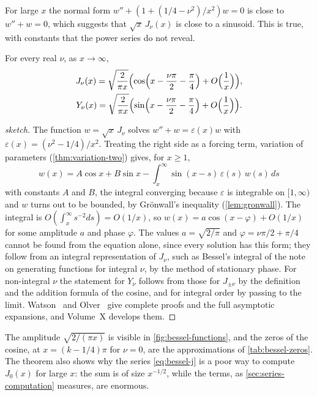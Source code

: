 For large $x$ the normal form $w''+(1+(1/4-\nu^2)/x^2)w=0$ is close to $w''+w=0$, which suggests that $\sqrt x\,J_\nu(x)$ is close to a sinusoid. This is true, with constants that the power series do not reveal.

\begin{theorem}
\label{thm:bessel-asymptotic}
For every real $\nu$, as $x\to\infty$,
\begin{gather*}
J_\nu(x)=\sqrt{\frac2{\pi x}}\Bigl(\cos\Bigl(x-\frac{\nu\pi}2-\frac\pi4\Bigr)+O\Bigl(\frac1x\Bigr)\Bigr),\\
Y_\nu(x)=\sqrt{\frac2{\pi x}}\Bigl(\sin\Bigl(x-\frac{\nu\pi}2-\frac\pi4\Bigr)+O\Bigl(\frac1x\Bigr)\Bigr).
\end{gather*}
\end{theorem}

\begin{proof}[sketch]
The function $w=\sqrt x\,J_\nu$ solves $w''+w=\varepsilon(x)w$ with $\varepsilon(x)=(\nu^2-1/4)/x^2$. Treating the right side as a forcing term, variation of parameters (\cref{thm:variation-two}) gives, for $x\ge1$,
\[
w(x)=A\cos x+B\sin x-\int_x^\infty\sin(x-s)\,\varepsilon(s)\,w(s)\,ds
\]
with constants $A$ and $B$, the integral converging because $\varepsilon$ is integrable on $[1,\infty)$ and $w$ turns out to be bounded, by Gr\"onwall's inequality (\cref{lem:gronwall}). The integral is $O(\int_x^\infty s^{-2}ds)=O(1/x)$, so $w(x)=a\cos(x-\varphi)+O(1/x)$ for some amplitude $a$ and phase $\varphi$. The values $a=\sqrt{2/\pi}$ and $\varphi=\nu\pi/2+\pi/4$ cannot be found from the equation alone, since every solution has this form; they follow from an integral representation of $J_\nu$, such as Bessel's integral of the note on generating functions for integral $\nu$, by the method of stationary phase. For non-integral $\nu$ the statement for $Y_\nu$ follows from those for $J_{\pm\nu}$ by the definition and the addition formula of the cosine, and for integral order by passing to the limit. Watson~\cite[Chap.~VII]{watson1944} and Olver~\cite[Chap.~7]{olver1997asymptotics} give complete proofs and the full asymptotic expansions, and Volume~X develops them.
\end{proof}

The amplitude $\sqrt{2/(\pi x)}$ is visible in \cref{fig:bessel-functions}, and the zeros of the cosine, at $x=(k-1/4)\pi$ for $\nu=0$, are the approximations of \cref{tab:bessel-zeros}. The theorem also shows why the series \eqref{eq:bessel-j} is a poor way to compute $J_0(x)$ for large $x$: the sum is of size $x^{-1/2}$, while the terms, as \cref{sec:series-computation} measures, are enormous.

